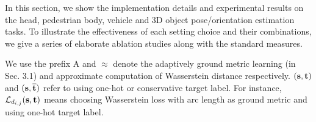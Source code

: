 In this section, we show the implementation details and experimental results on the head, pedestrian body, vehicle and 3D object pose/orientation estimation tasks. To illustrate the effectiveness of each setting choice and their combinations, we give a series of elaborate ablation studies along with the standard measures.


We use the prefix A and $\approx$ denote the adaptively ground metric learning (in Sec. 3.1) and approximate computation of Wasserstein distance \cite{cuturi2013sinkhorn,frogner2015learning} respectively. ${(\rm{{\textbf{s},{\textbf{t}}}})}$ and ${(\rm{{\textbf{s},\overline{\textbf{t}}}})}$ refer to using one-hot or conservative target label. For instance, $\mathcal{L}_{d_{i,j}}(\rm{\textbf{s},{\textbf{t}}})$ means choosing Wasserstein loss with arc length as ground metric and using one-hot target label.
